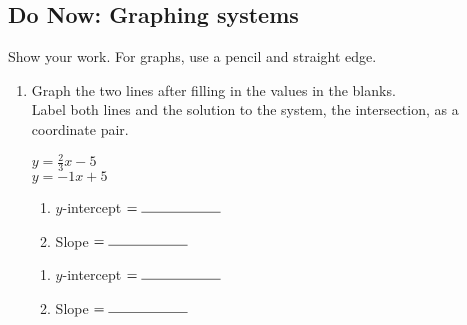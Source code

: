 \documentclass[12pt, oneside]{article}
\begin{document}
\subsection*{Do Now: Graphing systems}
Show your work. For graphs, use a pencil and straight edge.
  \begin{enumerate}

    \item Graph the two lines after filling in the values in the blanks.\\[0.5cm]
    Label both lines and the solution to the system, the intersection, as a coordinate pair.\\

    \begin{multicols}{2}
      $y=\frac{2}{3} x -5$ \\
      $y=-1 x +5$
    \end{multicols}
    \begin{multicols}{2}
      \raggedcolumns
      \begin{enumerate}
        \item $y$-intercept $= \rule{2cm}{0.15mm}$ \\[0.5cm]
        \item Slope \hspace{0.7cm} $= \rule{2cm}{0.15mm}$\\[0.5cm]
      \end{enumerate}
      \begin{enumerate}
        \item $y$-intercept $= \rule{2cm}{0.15mm}$ \\[0.5cm]
        \item Slope \hspace{0.7cm} $= \rule{2cm}{0.15mm}$\\[0.5cm]
      \end{enumerate}
    \end{multicols}

    \begin{center} %
    \end{center}




\end{enumerate}
\end{document}
